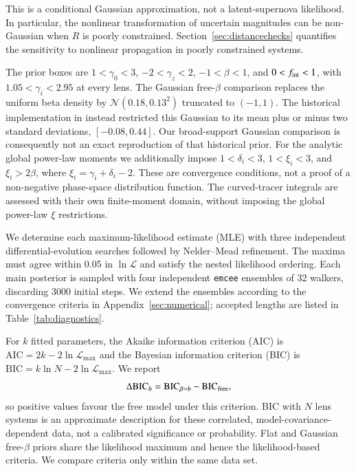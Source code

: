 \documentclass{aa}
\begin{document}
This is a conditional Gaussian approximation, not a latent-supernova likelihood. In particular, the nonlinear transformation of uncertain magnitudes can be non-Gaussian when $R$ is poorly constrained. Section~\ref{sec:distancechecks} quantifies the sensitivity to nonlinear propagation in poorly constrained systems.

The prior boxes are $1<\gamma_0<3$, $-2<\gamma_z<2$, $-1<\beta<1$, and $0<f_{\rm int}<1$, with $1.05<\gamma_i<2.95$ at every lens. The Gaussian free-$\beta$ comparison replaces the uniform beta density by $\mathcal N(0.18,0.13^2)$ truncated to $(-1,1)$. The historical implementation in \citet{stz1902} instead restricted this Gaussian to its mean plus or minus two standard deviations, $[-0.08,0.44]$. Our broad-support Gaussian comparison is consequently not an exact reproduction of that historical prior. For the analytic global power-law moments we additionally impose $1<\delta_i<3$, $1<\xi_i<3$, and $\xi_i>2\beta$, where $\xi_i=\gamma_i+\delta_i-2$. These are convergence conditions, not a proof of a non-negative phase-space distribution function. The curved-tracer integrals are assessed with their own finite-moment domain, without imposing the global power-law $\xi$ restrictions.

We determine each maximum-likelihood estimate (MLE) with three independent differential-evolution searches followed by Nelder--Mead refinement. The maxima must agree within 0.05 in $\ln\mathcal L$ and satisfy the nested likelihood ordering. Each main posterior is sampled with four independent \texttt{emcee} ensembles \citep{ForemanMackey2013} of 32 walkers, discarding 3000 initial steps. We extend the ensembles according to the convergence criteria in Appendix~\ref{sec:numerical}; accepted lengths are listed in Table~\ref{tab:diagnostics}.

For $k$ fitted parameters, the Akaike information criterion (AIC) is $\mathrm{AIC}=2k-2\ln\mathcal L_{\max}$ and the Bayesian information criterion (BIC) is $\mathrm{BIC}=k\ln N-2\ln\mathcal L_{\max}$. We report
\begin{equation}
\Delta\mathrm{BIC}_{b}=\mathrm{BIC}_{\beta=b}-\mathrm{BIC}_{\rm free},
\end{equation}
so positive values favour the free model under this criterion. BIC with $N$ lens systems is an approximate description for these correlated, model-covariance-dependent data, not a calibrated significance or probability. Flat and Gaussian free-$\beta$ priors share the likelihood maximum and hence the likelihood-based criteria. We compare criteria only within the same data set.
\end{document}
